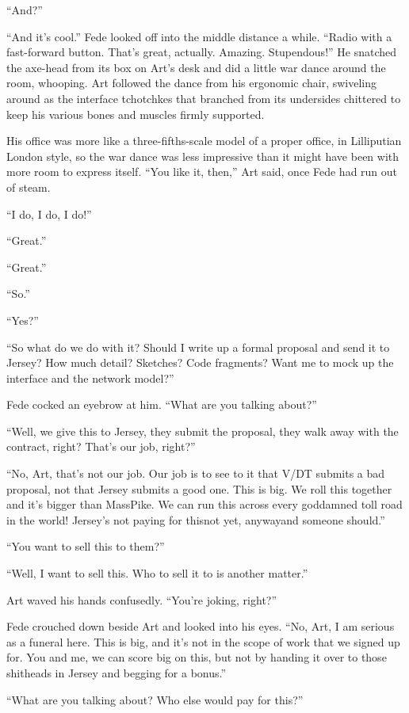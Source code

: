 “And?”

“And it’s cool.” Fede looked off into the middle distance a while.
“Radio with a fast-forward button. That’s great, actually. Amazing.
Stupendous!” He snatched the axe-head from its box on Art’s desk
and did a little war dance around the room, whooping. Art followed
the dance from his ergonomic chair, swiveling around as the
interface tchotchkes that branched from its undersides chittered to
keep his various bones and muscles firmly supported.

His office was more like a three-fifths-scale model of a proper
office, in Lilliputian London style, so the war dance was less
impressive than it might have been with more room to express
itself. “You like it, then,” Art said, once Fede had run out of
steam.

“I do, I do, I do!”

“Great.”

“Great.”

“So.”

“Yes?”

“So what do we do with it? Should I write up a formal proposal and
send it to Jersey? How much detail? Sketches? Code fragments? Want
me to mock up the interface and the network model?”

Fede cocked an eyebrow at him. “What are you talking about?”

“Well, we give this to Jersey, they submit the proposal, they walk
away with the contract, right? That’s our job, right?”

“No, Art, that’s not our job. Our job is to see to it that V/DT
submits a bad proposal, not that Jersey submits a good one. This is
big. We roll this together and it’s bigger than MassPike. We can
run this across every goddamned toll road in the world! Jersey’s
not paying for this{\dash}not yet, anyway{\dash}and someone should.”

“You want to sell this to them?”

“Well, I want to sell this. Who to sell it to is another matter.”

Art waved his hands confusedly. “You’re joking, right?”

Fede crouched down beside Art and looked into his eyes. “No, Art, I
am serious as a funeral here. This is big, and it’s not in the
scope of work that we signed up for. You and me, we can score big
on this, but not by handing it over to those shitheads in Jersey
and begging for a bonus.”

“What are you talking about? Who else would pay for this?”


